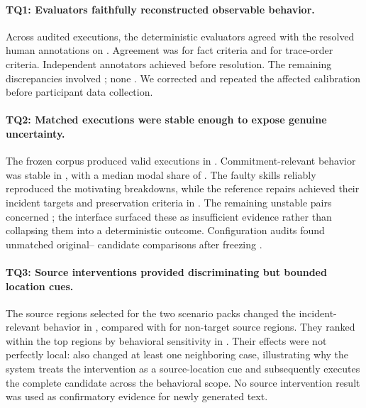 \paragraph{TQ1: Evaluators faithfully reconstructed observable behavior.}
Across  audited executions,
the deterministic evaluators agreed with the resolved human annotations on
. Agreement was
 for fact criteria and
 for trace-order criteria. Independent
annotators achieved  before
resolution. The remaining  discrepancies involved
; none
.
We corrected  and repeated the affected calibration before
participant data collection.

\paragraph{TQ2: Matched executions were stable enough to expose genuine
uncertainty.}
The frozen corpus produced valid executions in
. Commitment-relevant
behavior was stable in , with a median modal share of
. The faulty skills reliably
reproduced the motivating breakdowns, while the reference repairs achieved
their incident targets and preservation criteria in
. The remaining unstable pairs concerned
; the interface surfaced these as
insufficient evidence rather than collapsing them into a deterministic
outcome. Configuration audits found  unmatched original--
candidate comparisons after freezing .

\paragraph{TQ3: Source interventions provided discriminating but bounded
location cues.}
The source regions selected for the two scenario packs changed the
incident-relevant behavior in ,
compared with  for non-target source
regions. They ranked within the top  regions by
behavioral sensitivity in .
Their effects were not perfectly local:  also
changed at least one neighboring case, illustrating why the system treats the
intervention as a source-location cue and subsequently executes the complete
candidate across the behavioral scope. No source intervention result was used
as confirmatory evidence for newly generated text.

